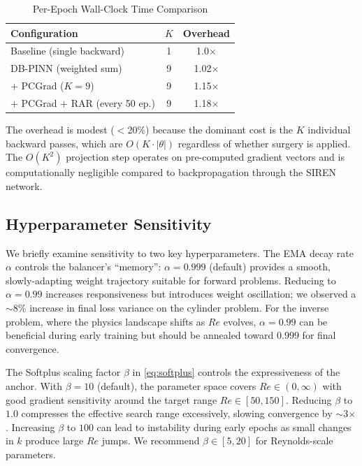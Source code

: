 \documentclass[conference]{IEEEtran}
\begin{document}
\begin{table}[htbp]
\caption{Per-Epoch Wall-Clock Time Comparison}
\label{tab:timing}
\centering
\begin{tabular}{@{}lcc@{}}
\toprule
\textbf{Configuration} & \textbf{$K$} & \textbf{Overhead} \\
\midrule
Baseline (single backward)      & 1  & 1.0$\times$ \\
DB-PINN (weighted sum)          & 9  & 1.02$\times$ \\
+ PCGrad ($K=9$)                & 9  & 1.15$\times$ \\
+ PCGrad + RAR (every 50 ep.)   & 9  & 1.18$\times$ \\
\bottomrule
\end{tabular}
\end{table}

The overhead is modest ($<$20\%) because the dominant cost is the $K$ individual backward passes, which are $O(K \cdot |\theta|)$ regardless of whether surgery is applied. The $O(K^2)$ projection step operates on pre-computed gradient vectors and is computationally negligible compared to backpropagation through the SIREN network.

\subsection{Hyperparameter Sensitivity}
\label{sec:sensitivity}

We briefly examine sensitivity to two key hyperparameters. The EMA decay rate $\alpha$ controls the balancer's ``memory'': $\alpha = 0.999$ (default) provides a smooth, slowly-adapting weight trajectory suitable for forward problems. Reducing to $\alpha = 0.99$ increases responsiveness but introduces weight oscillation; we observed a $\sim$8\% increase in final loss variance on the cylinder problem. For the inverse problem, where the physics landscape shifts as $Re$ evolves, $\alpha = 0.99$ can be beneficial during early training but should be annealed toward $0.999$ for final convergence.

The Softplus scaling factor $\beta$ in \cref{eq:softplus} controls the expressiveness of the anchor. With $\beta = 10$ (default), the parameter space covers $Re \in (0, \infty)$ with good gradient sensitivity around the target range $Re \in [50, 150]$. Reducing $\beta$ to $1.0$ compresses the effective search range excessively, slowing convergence by $\sim$3$\times$. Increasing $\beta$ to $100$ can lead to instability during early epochs as small changes in $k$ produce large $Re$ jumps. We recommend $\beta \in [5, 20]$ for Reynolds-scale parameters.
\end{document}
